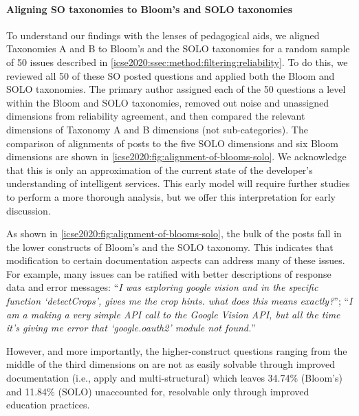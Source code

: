 \paragraph{Aligning SO taxonomies to Bloom's and SOLO taxonomies}

To understand our findings with the lenses of pedagogical aids, we aligned Taxonomies A and B to Bloom's and the SOLO taxonomies for a random sample of 50 issues described in \cref{icse2020:ssec:method:filtering:reliability}.  To do this, we reviewed all 50 of these SO posted questions and applied both the Bloom and SOLO taxonomies. The primary author assigned each of the 50 questions a level within the Bloom and SOLO taxonomies, removed out noise  and unassigned dimensions from reliability agreement, and then compared the relevant dimensions of Taxonomy A and B dimensions (not sub-categories). The comparison of alignments of posts to the five SOLO dimensions and six Bloom dimensions are shown in \cref{icse2020:fig:alignment-of-blooms-solo}. 
We acknowledge that this is only an approximation of the current state of the developer's understanding of intelligent services. This early model will require further studies to perform a more thorough analysis, but we offer this interpretation for early discussion. %

As shown in \cref{icse2020:fig:alignment-of-blooms-solo}, the bulk of the posts fall in the lower constructs of Bloom's and the SOLO taxonomy. This indicates that modification to certain documentation aspects can address many of these issues. For example, many issues can be ratified with better descriptions of response data and error messages: ``\textit{I was exploring google vision and in the specific function `detectCrops', gives me the crop hints. what does this means exactly?}''; ``\textit{I am a making a very simple API call to the Google Vision API, but all the time it's giving me error that `google.oauth2' module not found.}''

However, and more importantly, the higher-construct questions ranging from the middle of the third dimensions on are not as easily solvable through improved documentation (i.e., apply and multi-structural) which leaves 34.74\% (Bloom's) and 11.84\% (SOLO) unaccounted for, resolvable only through improved education practices. %


